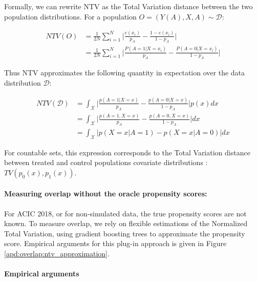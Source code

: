 \documentclass[french,12pt,twoside,a4paper]{book}
\begin{document}
\begin{appendices}
  Formally, we can rewrite NTV as the Total Variation distance
  between the two population distributions. For a population $O = (Y(A), X, A)
    \sim \mathcal{D}$:

  \begin{align*}
    NTV(O) & = \frac{1}{2N} \sum_{i =1}^{N} \big | \frac{e(x_i)}{p_A}-\frac{1-e(x_i)}{1-{p_A}} \big|         \\
           & = \frac{1}{2N} \sum_{i =1}^{N} \big|\frac{P(A=1|X=x_i)}{p_A}-\frac{P(A=0|X=x_i)}{1-{p_A}} \big|
  \end{align*}

  Thus NTV approximates the following quantity in expectation over the data
  distribution $\mathcal{D}$:

  \begin{align*}
    NTV(\mathcal{D}) & = \int_{\mathcal{X}} \big | \frac{p(A=1|X=x)}{p_A}-\frac{p(A=0|X=x)}{1-{p_A}} \big | p(x)dx \\
                     & = \int_{\mathcal{X}} \big | \frac{p(A=1, X=x)}{p_A}-\frac{p(A=0, X=x)}{1-{p_A}} \big |dx    \\
                     & = \int_{\mathcal{X}} \big | p(X=x|A=1)- p(X=x|A=0) \big |dx
  \end{align*}

  For countable sets, this expression corresponds to the Total Variation distance
  between treated and control populations covariate distributions : $TV(p_0(x),
    p_1(x))$.

  \paragraph{Measuring overlap without the oracle propensity scores:} For ACIC
  2018, or for non-simulated data, the true propensity scores are not known. To
  measure overlap, we rely on flexible estimations of the Normalized Total
  Variation, using gradient boosting trees to approximate the propensity score.
  Empirical arguments for this plug-in approach is given in Figure
  \ref{apd:overlap:ntv_approximation}.

  \paragraph{Empirical arguments}


\end{appendices}
\end{document}
